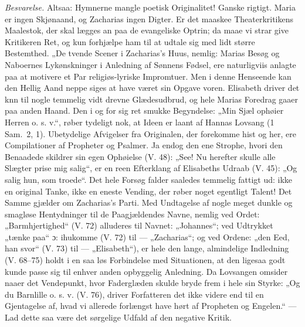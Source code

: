 \documentclass[12pt,a4paper]{book}
\begin{document}
\emph{Besvarelse.} Altsaa: Hymnerne mangle poetisk Originalitet! Ganske rigtigt.
Maria er ingen Skjønaand, og Zacharias ingen Digter. Er det maaskee
Theaterkritikens Maalestok, der skal lægges an paa de evangeliske Optrin; da maae
vi strar give Kritikeren Ret, og kun forhjælpe ham til at udtale sig med lidt
større Bestemthed. „De tvende Scener i Zacharias's Huus, nemlig: Marias Besøg og
Naboernes Lykønskninger i Anledning af Sønnens Fødsel, ere naturligviis anlagte
paa at motivere et Par religiøs-lyriske Impromtuer. Men i denne Henseende kan den
Hellig Aand neppe siges at have været sin Opgave voren. Elisabeth driver det
knn til nogle temmelig vidt drevne Glædesudbrud, og hele Marias Foredrag gaaer paa
anden Haand. Den
i og for sig ret smukke Begyndelse: „Min Sjæl ophøier Herren o. s. v.“, røber
tydeligt nok, at Ideen er laant af Hannas Lovsang (1 Sam.\ 2, 1). Ubetydelige
Afvigelser fra Originalen, der forekomme hist og her, ere Compilationer af
Propheter og Psalmer. Ja endog den ene Strophe, hvori den Benaadede skildrer sin
egen Ophøielse (V. 48): „See! Nu herefter skulle alle Slægter prise mig salig“, er
en reen Efterklang af Elisabeths Udraab (V. 45): „Og salig hun, som troede“. Det
hele Forsøg falder saaledes temmelig fattigt ud: ikke en original Tanke, ikke en
eneste Vending, der røber noget egentligt Talent! Det Samme gjælder om
Zacharias's Parti. Med Undtagelse af nogle meget dunkle og smagløse Hentydninger
til de Paagjældendes Navne, nemlig ved Ordet: „Barmhjertighed“ (V. 72) alluderes
til Navnet: „Johannes“; ved Udtrykket „tænke paa“ ɔ: ihukomme (V. 72) til ---
„Zacharias“; og ved Ordene: „den Eed, han svor“ (V. 73) til --- „Elisabeth“), er
hele den lange, almindelige Indledning (V. 68--75) holdt i en saa løs Forbindelse
med Situationen, at den ligesaa godt kunde passe sig til enhver anden opbyggelig
Anledning. Da Lovsangen omsider naaer det Vendepunkt, hvor Faderglæden skulde
bryde frem i hele sin Styrke: „Og du Barnlille o. s. v. (V. 76), driver
Forfatteren det ikke videre end til en Gjentagelse af, hvad vi allerede forlængst
have hørt af Propheten og Engelen.“ --- Lad dette saa være det sørgelige Udfald af
den negative Kritik.
\end{document}
